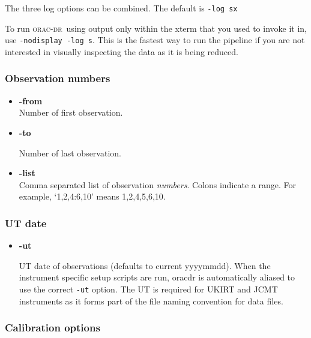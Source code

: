 \documentclass[twoside,11pt]{article}
\newcommand{\xlabel}[1]{}
\renewcommand{\_}{\texttt{\symbol{95}}}
\newcommand{\oracdr}{\textsc{orac-dr}}
\begin{document}
The three log options can be combined. The default is {\tt -log sx}

To run \oracdr\ using output only within the xterm that you used
to invoke it in, use {\tt -nodisplay -log s}. This is the fastest way
to run the pipeline if you are not interested in visually
inspecting the data as it is being reduced.

\subsubsection*{Observation numbers}

\begin{itemize}

\item{\bf -from}
\hfil\\
Number of first observation.

\item{\bf -to}

Number of last observation.

\item{\bf -list}
\hfil\\
Comma separated list of observation {\em numbers\/}. Colons indicate a range.
For example, `1,2,4:6,10' means 1,2,4,5,6,10.

\end{itemize}

\subsubsection*{UT date}

\begin{itemize}

\item{\bf -ut}

UT date of observations (defaults to current yyyymmdd). When the
instrument specific setup scripts are run, oracdr is automatically
aliased to use the correct {\tt -ut} option. The UT is required for
UKIRT and JCMT instruments as it forms part of the file naming
convention for data files.

\end{itemize}

\subsubsection*{Calibration options\xlabel{calibration_options}}
\end{document}
